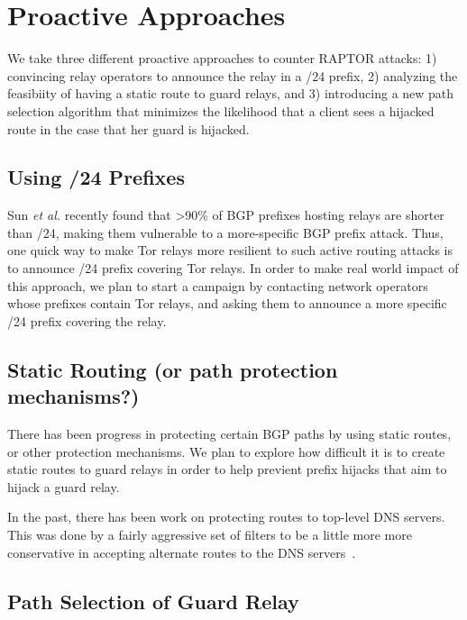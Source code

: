 \section{Proactive Approaches}
We take three different proactive approaches to counter RAPTOR attacks: 1) convincing relay operators to announce the relay in a /24 prefix, 2) analyzing the feasibiity of having a static route to guard relays, and 3) introducing a new path selection algorithm that minimizes the likelihood that a client sees a hijacked route in the case that her guard is hijacked.

\subsection{Using /24 Prefixes}

Sun \emph{et al.} \cite{sun2015raptor} recently found that >90\% of BGP prefixes hosting relays are
shorter than /24, making them vulnerable to a more-specific BGP prefix attack. Thus, one quick way to make Tor relays more resilient to such active routing attacks is to announce /24 prefix covering Tor relays. In order to make real world impact of this approach, we plan to start a campaign by contacting network operators whose prefixes contain Tor relays, and asking them to announce a more specific /24 prefix covering the relay. 

\subsection{Static Routing (or path protection mechanisms?)}

There has been progress in protecting certain BGP paths by using static routes, or other protection mechanisms.  We plan to explore how difficult it is to create static routes to guard relays in order to help previent prefix hijacks that aim to hijack a guard relay.  

In the past, there has been work on protecting routes to top-level DNS servers.  This was done by a fairly aggressive set of filters to be a little more more conservative in accepting alternate routes to the DNS servers~\cite{staticroute}.

\subsection{Path Selection of Guard Relay}

